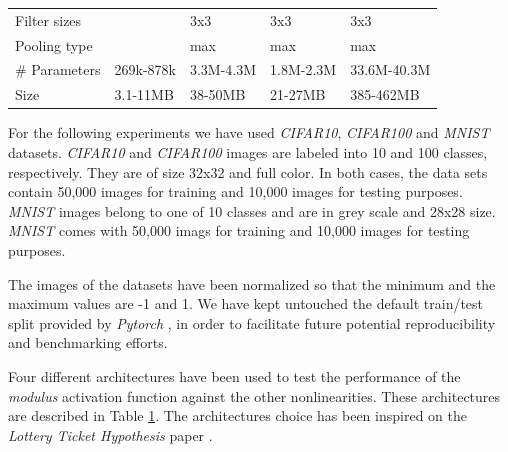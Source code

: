 \documentclass[authoryear]{elsarticle}
\begin{document}
\begin{table}[h]
\begin{tabular}[t]{lllll}
		Filter sizes &  & 3x3 & 3x3 & 3x3 \\
		Pooling type & & max & max & max \\
		\# Parameters        & 269k-878k       & 3.3M-4.3M   & 1.8M-2.3M                                            & 33.6M-40.3M                                                                             \\ 			        
		Size                 & 3.1-11MB & 38-50MB & 21-27MB & 385-462MB \\ \bottomrule
	\end{tabular}
	\label{tab:architectures}
	\vspace{20pt}
\end{table}

For the following experiments we have used \textit{CIFAR10}, \textit{CIFAR100} \citep{krizhevsky09} and \textit{MNIST} \citep{lecun2010} datasets. \textit{CIFAR10} and \textit{CIFAR100} images are labeled into 10 and 100 classes, respectively. They are of size 32x32 and full color. In both cases, the data sets contain 50,000 images for training and 10,000 images for testing purposes. \textit{MNIST} images belong to one of 10 classes and are in grey scale and 28x28 size. \textit{MNIST} comes with 50,000 imags for training and 10,000 images for testing purposes.

The images of the datasets have been normalized so that the minimum and the maximum values are -1 and 1. We have kept untouched the default train/test split provided by \textit{Pytorch} \citep{Paszke2019}, in order to facilitate future potential reproducibility and benchmarking efforts. 

Four different architectures have been used to test the performance of the \textit{modulus} activation function against the other nonlinearities. These architectures are described in Table \ref{tab:architectures}. The architectures choice has been inspired on the \textit{Lottery Ticket Hypothesis} paper \citep{frankleC19}.



\end{document}
